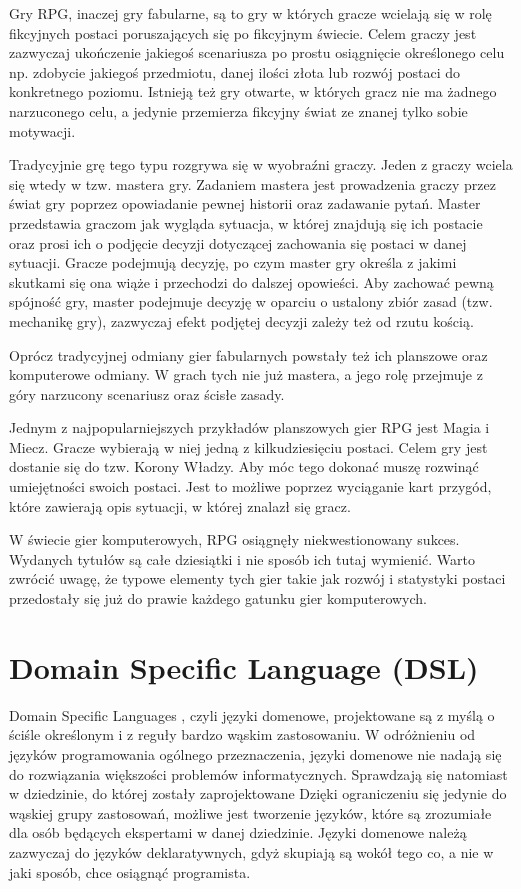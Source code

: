 \documentclass[openright]{xmgr}
\begin{document}
Gry RPG, inaczej gry fabularne, są to gry w których gracze wcielają się w rolę fikcyjnych postaci poruszających się po fikcyjnym świecie.  Celem graczy jest zazwyczaj ukończenie jakiegoś scenariusza po prostu osiągnięcie określonego celu np. zdobycie jakiegoś przedmiotu, danej ilości złota lub rozwój postaci do konkretnego poziomu. Istnieją też gry otwarte, w których gracz nie ma żadnego narzuconego celu, a jedynie przemierza fikcyjny świat ze znanej tylko sobie motywacji. 

Tradycyjnie grę tego typu rozgrywa się w wyobraźni graczy. Jeden z graczy wciela się wtedy w tzw. mastera gry. Zadaniem mastera jest prowadzenia graczy przez świat gry poprzez opowiadanie pewnej historii oraz zadawanie pytań. Master przedstawia graczom jak wygląda sytuacja, w której znajdują się ich postacie oraz prosi ich o podjęcie decyzji dotyczącej zachowania się postaci w danej sytuacji. Gracze podejmują decyzję, po czym master gry określa z jakimi skutkami się ona wiąże i przechodzi do dalszej opowieści. Aby zachować pewną spójność gry, master podejmuje decyzję w oparciu o ustalony zbiór zasad (tzw. mechanikę gry), zazwyczaj efekt podjętej decyzji zależy też od rzutu kością.

Oprócz tradycyjnej odmiany gier fabularnych powstały też ich planszowe oraz komputerowe odmiany. W grach tych nie już mastera, a jego rolę przejmuje z góry narzucony scenariusz oraz ścisłe zasady. 

Jednym z najpopularniejszych przykładów planszowych gier RPG jest Magia i Miecz. Gracze wybierają w niej jedną z kilkudziesięciu postaci. Celem gry jest dostanie się do tzw. Korony Władzy. Aby móc tego dokonać muszę rozwinąć umiejętności swoich postaci. Jest to możliwe poprzez wyciąganie kart przygód, które zawierają opis sytuacji, w której znalazł się gracz. 

W świecie gier komputerowych, RPG osiągnęły niekwestionowany sukces. Wydanych tytułów są całe dziesiątki i nie sposób ich tutaj wymienić. Warto zwrócić uwagę, że typowe elementy tych gier takie jak rozwój i statystyki postaci przedostały się już do prawie każdego gatunku gier komputerowych.

\section{Domain Specific Language (DSL)}

Domain Specific Languages \cite{DSL:2017}, czyli języki domenowe, projektowane są z myślą o ściśle określonym i z reguły bardzo wąskim zastosowaniu. W odróżnieniu od języków programowania ogólnego przeznaczenia, języki domenowe nie nadają się do rozwiązania większości problemów informatycznych. Sprawdzają się natomiast w dziedzinie, do której zostały zaprojektowane Dzięki ograniczeniu się jedynie do wąskiej grupy zastosowań, możliwe jest tworzenie języków, które są zrozumiałe dla osób będących ekspertami w danej dziedzinie. Języki domenowe należą zazwyczaj do języków deklaratywnych, gdyż skupiają są wokół tego co, a nie w jaki sposób, chce osiągnąć programista.
\end{document}
